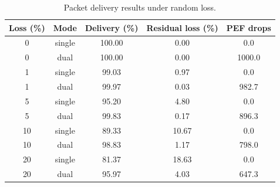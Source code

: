 \begin{table}[t]
\centering
\caption{Packet delivery results under random loss.}
\label{tab:loss-results}
\begin{tabular}{c c c c c}
\hline
Loss (\%) & Mode & Delivery (\%) & Residual loss (\%) & PEF drops \\
\hline
0 & single & 100.00 & 0.00 & 0.0 \\
0 & dual & 100.00 & 0.00 & 1000.0 \\
1 & single & 99.03 & 0.97 & 0.0 \\
1 & dual & 99.97 & 0.03 & 982.7 \\
5 & single & 95.20 & 4.80 & 0.0 \\
5 & dual & 99.83 & 0.17 & 896.3 \\
10 & single & 89.33 & 10.67 & 0.0 \\
10 & dual & 98.83 & 1.17 & 798.0 \\
20 & single & 81.37 & 18.63 & 0.0 \\
20 & dual & 95.97 & 4.03 & 647.3 \\
\hline
\end{tabular}
\end{table}
